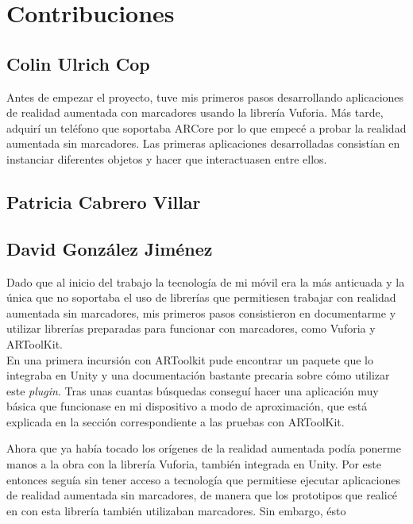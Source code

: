 \chapter{Contribuciones}
\section{Colin Ulrich Cop}
Antes de empezar el proyecto, tuve mis primeros pasos desarrollando aplicaciones de realidad aumentada con marcadores usando la librería Vuforia. Más tarde, adquirí un teléfono que soportaba ARCore por lo que empecé a probar la realidad aumentada sin marcadores. Las primeras aplicaciones desarrolladas consistían en instanciar diferentes objetos y hacer que interactuasen entre ellos.
\newpage
\section{Patricia Cabrero Villar}

\newpage
\section{David González Jiménez}
Dado que al inicio del trabajo la tecnología de mi móvil era la más anticuada y la única que no soportaba el uso de librerías que permitiesen trabajar con realidad aumentada sin marcadores, mis primeros pasos consistieron en documentarme y utilizar librerías preparadas para funcionar con marcadores, como Vuforia y ARToolKit.\\

En una primera incursión con ARToolkit pude encontrar un paquete que lo integraba en Unity y una documentación bastante precaria sobre cómo utilizar este \textit{plugin}. Tras unas cuantas búsquedas conseguí hacer una aplicación muy básica que funcionase en mi dispositivo a modo de aproximación, que está explicada en la sección correspondiente a las pruebas con ARToolKit.

Ahora que ya había tocado los orígenes de la realidad aumentada podía ponerme manos a la obra con la librería
Vuforia, también integrada en Unity. Por este entonces seguía sin tener acceso a tecnología que permitiese ejecutar aplicaciones de realidad aumentada sin marcadores, de manera que los prototipos que realicé en con esta librería también utilizaban marcadores. Sin embargo, ésto

\noindent